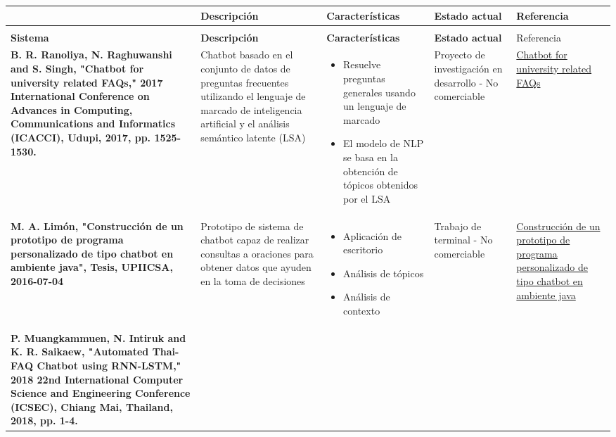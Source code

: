         \begin{longtable}{| >{\centering\arraybackslash}m{3cm} | >{\centering\arraybackslash}m{5cm} | >{\centering\arraybackslash}m{3cm} | >{\centering\arraybackslash}m{2cm} |
        >{\centering\arraybackslash}m{2cm} |}

            \hline
            {\bf Sistema} & {\bf Descripción} & {\bf Características} & {\bf Estado actual} & {\bf Referencia}  \\ \hline
            \endfirsthead
            
            \hline
            \multicolumn{5}{| c |}{Continuación de la tabla: \ref{long}}\\ \hline
            {\bf Sistema} & {\bf Descripción} & {\bf Características} & {\bf Estado actual} & {Referencia}  \\ \hline
            \endhead

            {\bf B. R. Ranoliya, N. Raghuwanshi and S. Singh, "Chatbot for university related FAQs," 2017 International Conference on Advances in Computing, Communications and Informatics (ICACCI), Udupi, 2017, pp. 1525-1530.} &
            Chatbot basado en el conjunto de datos de preguntas frecuentes utilizando el lenguaje de marcado de inteligencia artificial y el análisis semántico latente (LSA)& 
            \begin{itemize}[leftmargin=*]
                \item Resuelve preguntas generales usando un lenguaje de marcado
                \item El modelo de NLP se basa en la obtención de tópicos obtenidos por el LSA
            \end{itemize} &
            Proyecto de investigación en desarrollo - No comerciable &
            \href{https://ieeexplore.ieee.org/document/8126057}{Chatbot for university related FAQs}\\ \hline
            {\bf M. A. Limón, "Construcción de un prototipo de programa personalizado de tipo chatbot en ambiente java", Tesis, UPIICSA, 2016-07-04} &
            Prototipo de sistema de chatbot capaz de realizar consultas a oraciones para obtener datos que ayuden en la toma de decisiones
            & 
            \begin{itemize}[leftmargin=*]
                \item Aplicación de escritorio
                \item Análisis de tópicos
                \item Análisis de contexto
            \end{itemize} &
            Trabajo de terminal - No comerciable &
            \href{https://tesis.ipn.mx/bitstream/handle/123456789/17959/Tesis\%20FINAL.pdf}{Construcción de un prototipo de programa personalizado de tipo chatbot en ambiente java}\\ \hline
            {\bf P. Muangkammuen, N. Intiruk and K. R. Saikaew, "Automated Thai-FAQ Chatbot using RNN-LSTM," 2018 22nd International Computer Science and Engineering Conference (ICSEC), Chiang Mai, Thailand, 2018, pp. 1-4.} &
            

\end{longtable}
